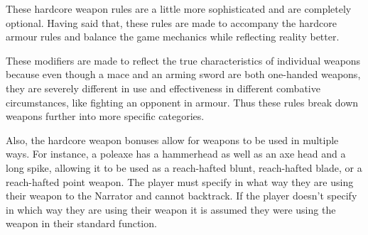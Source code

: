 These hardcore weapon rules are a little more sophisticated and are completely optional. Having said that, these rules are made to accompany the hardcore armour rules and balance the game mechanics while reflecting reality better.

These modifiers are made to reflect the true characteristics of individual weapons because even though a mace and an arming sword are both one-handed weapons, they are severely different in use and effectiveness in different combative circumstances, like fighting an opponent in armour. Thus these rules break down weapons further into more specific categories.

Also, the hardcore weapon bonuses allow for weapons to be used in multiple ways. For instance, a poleaxe has a hammerhead as well as an axe head and a long spike, allowing it to be used as a reach-hafted blunt, reach-hafted blade, or a reach-hafted point weapon. The player must specify in what way they are using their weapon to the Narrator and cannot backtrack. If the player doesn’t specify in which way they are using their weapon it is assumed they were using the weapon in their standard function.

